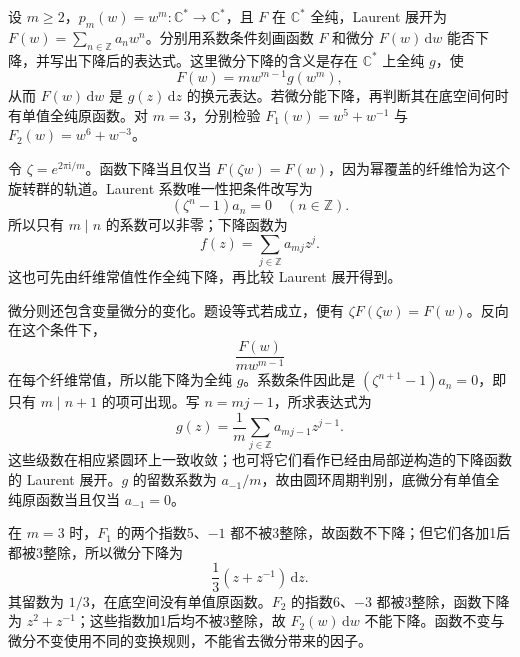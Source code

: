 \begin{exercise}\label{b3:ex:11-6}
设 \(m\ge2\)，\(p_m(w)=w^m:\mathbb C^*\to\mathbb C^*\)，且 \(F\) 在 \(\mathbb C^*\) 全纯，Laurent 展开为 \(F(w)=\sum_{n\in\mathbb Z}a_nw^n\)。分别用系数条件刻画函数 \(F\) 和微分 \(F(w)\,\mathrm dw\) 能否下降，并写出下降后的表达式。这里微分下降的含义是存在 \(\mathbb C^*\) 上全纯 \(g\)，使
\[
 F(w)=m w^{m-1}g(w^m),
\]
从而 \(F(w)\,\mathrm dw\) 是 \(g(z)\,\mathrm dz\) 的换元表达。若微分能下降，再判断其在底空间何时有单值全纯原函数。对 \(m=3\)，分别检验 \(F_1(w)=w^5+w^{-1}\) 与 \(F_2(w)=w^6+w^{-3}\)。
\end{exercise}
\begin{solution}
令 \(\zeta=e^{2\pi\mathrm i/m}\)。函数下降当且仅当 \(F(\zeta w)=F(w)\)，因为幂覆盖的纤维恰为这个旋转群的轨道。Laurent 系数唯一性把条件改写为
\[
 (\zeta^n-1)a_n=0\quad(n\in\mathbb Z).
\]
所以只有 \(m\mid n\) 的系数可以非零；下降函数为
\[
 f(z)=\sum_{j\in\mathbb Z}a_{mj}z^j.
\]
这也可先由纤维常值性作全纯下降，再比较 Laurent 展开得到。

微分则还包含变量微分的变化。题设等式若成立，便有 \(\zeta F(\zeta w)=F(w)\)。反向在这个条件下，
\[
 \frac{F(w)}{m w^{m-1}}
\]
在每个纤维常值，所以能下降为全纯 \(g\)。系数条件因此是 \((\zeta^{n+1}-1)a_n=0\)，即只有 \(m\mid n+1\) 的项可出现。写 \(n=mj-1\)，所求表达式为
\[
 g(z)=\frac1m\sum_{j\in\mathbb Z}a_{mj-1}z^{j-1}.
\]
这些级数在相应紧圆环上一致收敛；也可将它们看作已经由局部逆构造的下降函数的 Laurent 展开。\(g\) 的留数系数为 \(a_{-1}/m\)，故由圆环周期判别，底微分有单值全纯原函数当且仅当 \(a_{-1}=0\)。

在 \(m=3\) 时，\(F_1\) 的两个指数5、\(-1\) 都不被3整除，故函数不下降；但它们各加1后都被3整除，所以微分下降为
\[
 \frac13(z+z^{-1})\,\mathrm dz.
\]
其留数为 \(1/3\)，在底空间没有单值原函数。\(F_2\) 的指数6、\(-3\) 都被3整除，函数下降为 \(z^2+z^{-1}\)；这些指数加1后均不被3整除，故 \(F_2(w)\,\mathrm dw\) 不能下降。函数不变与微分不变使用不同的变换规则，不能省去微分带来的因子。
\end{solution}


